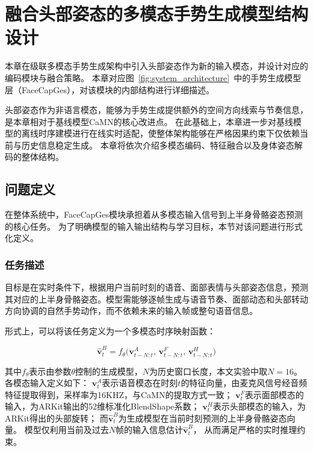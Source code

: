 \chapter{融合头部姿态的多模态手势生成模型结构设计}
\label{chap:model_architecture}

本章在级联多模态手势生成架构中引入头部姿态作为新的输入模态，并设计对应的编码模块与融合策略。
本章对应图~\ref{fig:system_architecture}~中的手势生成模型层（FaceCapGes），对该模块的内部结构进行详细描述。

头部姿态作为非语言模态，能够为手势生成提供额外的空间方向线索与节奏信息，是本章相对于基线模型CaMN\cite{beatcamn}的核心改进点。
在此基础上，本章进一步对基线模型的离线时序建模进行在线实时适配，使整体架构能够在严格因果约束下仅依赖当前与历史信息稳定生成。
本章将依次介绍多模态编码、特征融合以及身体姿态解码的整体结构。

\section{问题定义}
\label{sec:problem}

在整体系统中，FaceCapGes模块承担着从多模态输入信号到上半身骨骼姿态预测的核心任务。
为了明确模型的输入输出结构与学习目标，本节对该问题进行形式化定义。

\subsection{任务描述}

目标是在实时条件下，根据用户当前时刻的语音、面部表情与头部姿态信息，预测其对应的上半身骨骼姿态。模型需能够逐帧生成与语音节奏、面部动态和头部转动方向协调的自然手势动作，而不依赖未来的输入帧或整句语音信息。

形式上，可以将该任务定义为一个多模态时序映射函数：

\begin{equation}
\hat{\bm{v}}_{t}^{B} = f_\theta\!\big(\bm{v}_{t-N:t}^{A},\, \bm{v}_{t-N:t}^{F},\, \bm{v}_{t-N:t}^{H}\big)
\label{eq:task_mapping_f}
\end{equation}

其中$f_\theta$表示由参数$\theta$控制的生成模型，$N$为历史窗口长度，本文实验中取$N=16$。
各模态输入定义如下：
$\bm{v}_{t}^{A}$表示语音模态在时刻$t$的特征向量，由麦克风信号经音频特征提取得到，采样率为16KHZ，与CaMN\cite{beatcamn}的提取方式一致；
$\bm{v}_{t}^{F}$表示面部模态的输入，为ARKit输出的52维标准化BlendShape系数；
$\bm{v}_{t}^{H}$表示头部模态的输入，为ARKit得出的头部旋转；
而$\hat{\bm{v}}_{t}^{B}$为生成模型在当前时刻预测的上半身骨骼姿态向量。
%
模型仅利用当前及过去$N$帧的输入信息估计$\hat{\bm{v}}_{t}^{B}$，
从而满足严格的实时推理约束。

